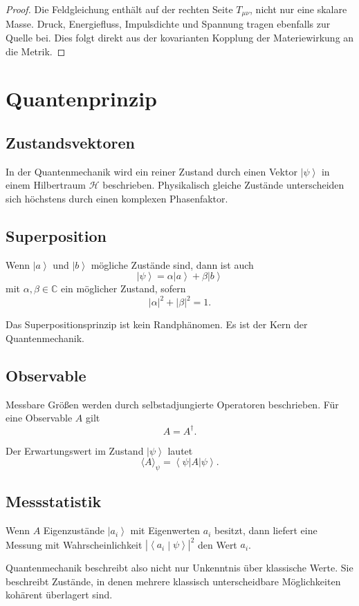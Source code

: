\documentclass[11pt,a4paper,oneside]{book}
\theoremstyle{definition}
\theoremstyle{plain}
\theoremstyle{remark}
\newcommand{\C}{\mathbb{C}}
\newcommand{\Hh}{\mathcal{H}}
\newcommand{\ket}[1]{\left|#1\right\rangle}
\newcommand{\bra}[1]{\left\langle#1\right|}
\newcommand{\braket}[2]{\left\langle#1\middle|#2\right\rangle}
\begin{document}
\begin{proof}
Die Feldgleichung enthält auf der rechten Seite $T_{\mu\nu}$, nicht nur eine skalare Masse. Druck, Energiefluss, Impulsdichte und Spannung tragen ebenfalls zur Quelle bei. Dies folgt direkt aus der kovarianten Kopplung der Materiewirkung an die Metrik.
\end{proof}

\chapter{Quantenprinzip}
\section{Zustandsvektoren}
In der Quantenmechanik wird ein reiner Zustand durch einen Vektor $\ket{\psi}$ in einem Hilbertraum $\Hh$ beschrieben. Physikalisch gleiche Zustände unterscheiden sich höchstens durch einen komplexen Phasenfaktor.

\section{Superposition}
Wenn $\ket{a}$ und $\ket{b}$ mögliche Zustände sind, dann ist auch
\[
\ket{\psi}=\alpha\ket{a}+\beta\ket{b}
\]
mit $\alpha,\beta\in\C$ ein möglicher Zustand, sofern
\[
|\alpha|^2+|\beta|^2=1.
\]

Das Superpositionsprinzip ist kein Randphänomen. Es ist der Kern der Quantenmechanik.

\section{Observable}
Messbare Größen werden durch selbstadjungierte Operatoren beschrieben. Für eine Observable $A$ gilt
\[
A=A^\dagger.
\]

Der Erwartungswert im Zustand $\ket{\psi}$ lautet
\[
\langle A\rangle_\psi = \bra{\psi}A\ket{\psi}.
\]

\section{Messstatistik}
Wenn $A$ Eigenzustände $\ket{a_i}$ mit Eigenwerten $a_i$ besitzt, dann liefert eine Messung mit Wahrscheinlichkeit $|\braket{a_i}{\psi}|^2$ den Wert $a_i$.

Quantenmechanik beschreibt also nicht nur Unkenntnis über klassische Werte. Sie beschreibt Zustände, in denen mehrere klassisch unterscheidbare Möglichkeiten kohärent überlagert sind.
\end{document}
